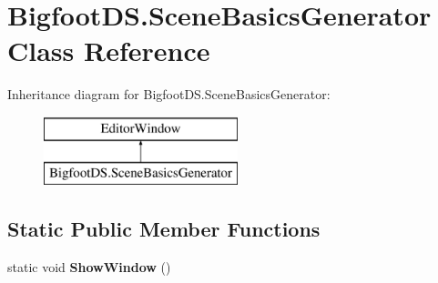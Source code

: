\hypertarget{class_bigfoot_d_s_1_1_scene_basics_generator}{}\section{Bigfoot\+D\+S.\+Scene\+Basics\+Generator Class Reference}
\label{class_bigfoot_d_s_1_1_scene_basics_generator}
Inheritance diagram for Bigfoot\+D\+S.\+Scene\+Basics\+Generator\+:\begin{figure}[H]
\begin{center}
\leavevmode
\includegraphics[height=2.000000cm]{class_bigfoot_d_s_1_1_scene_basics_generator}
\end{center}
\end{figure}
\subsection*{Static Public Member Functions}
\begin{DoxyCompactItemize}
\item 
\mbox{\label{class_bigfoot_d_s_1_1_scene_basics_generator_a7658ebc40708b897c6f4685dcf4ec5f9}} 
static void {\bfseries Show\+Window} ()
\end{DoxyCompactItemize}
